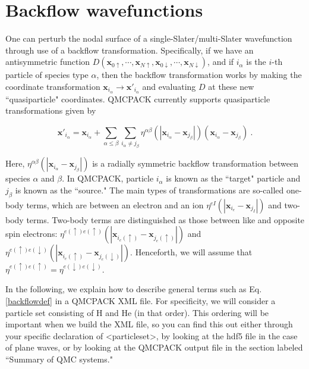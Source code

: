 \section{Backflow wavefunctions}

\label{sec:backflow}

One can perturb the nodal surface of a single-Slater/multi-Slater wavefunction through use of a backflow transformation.  Specifically, if we have an antisymmetric function $D(\mathbf{x}_{0\uparrow},\cdots,\mathbf{x}_{N\uparrow}, \mathbf{x}_{0\downarrow},\cdots,\mathbf{x}_{N\downarrow})$, and if $i_\alpha$ is the $i$-th particle of species type $\alpha$, then the backflow transformation works by making the coordinate transformation $\mathbf{x}_{i_\alpha} \to \mathbf{x}'_{i_\alpha}$ and evaluating $D$ at these new ``quasiparticle" coordinates.  QMCPACK currently supports quasiparticle transformations given by

\begin{equation}\label{backflowdef}
\mathbf{x}'_{i_\alpha}=\mathbf{x}_{i_\alpha}+\sum_{\alpha \leq \beta} \sum_{i_\alpha \neq j_\beta} \eta^{\alpha\beta}(|\mathbf{x}_{i_\alpha}-\mathbf{x}_{j_\beta}|)(\mathbf{x}_{i_\alpha}-\mathbf{x}_{j_\beta})\:.
\end{equation}

Here, $\eta^{\alpha\beta}(|\mathbf{x}_{i_\alpha}-\mathbf{x}_{j_\beta}|)$ is a radially symmetric backflow transformation between species $\alpha$ and $\beta$.  In QMCPACK, particle $i_\alpha$ is known as the ``target" particle and $j_\beta$ is known as the ``source."  The main types of transformations are so-called one-body terms, which are between an electron and an ion $\eta^{eI}(|\mathbf{x}_{i_e}-\mathbf{x}_{j_I}|)$ and two-body terms.  Two-body terms are distinguished as those between like and opposite spin electrons:  $\eta^{e(\uparrow)e(\uparrow)}(|\mathbf{x}_{i_e(\uparrow)}-\mathbf{x}_{j_e(\uparrow)}|)$ and  $\eta^{e(\uparrow)e(\downarrow)}(|\mathbf{x}_{i_e(\uparrow)}-\mathbf{x}_{j_e(\downarrow)}|)$.  Henceforth, we will assume that $\eta^{e(\uparrow)e(\uparrow)}=\eta^{e(\downarrow)e(\downarrow)}$.

In the following, we explain how to describe general terms such as Eq. \ref{backflowdef} in a QMCPACK XML file.  For specificity, we will consider a particle set consisting of H and He (in that order).  This ordering will be important when we build the XML file, so you can find this out either through your specific declaration of <particleset>, by looking at the hdf5 file in the case of plane waves, or by looking at the QMCPACK output file in the section labeled ``Summary of QMC systems."  
